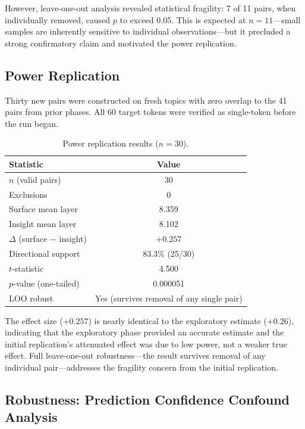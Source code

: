 \documentclass[10pt]{article}
\begin{document}
However, leave-one-out analysis revealed statistical fragility: 7 of 11 pairs, when individually removed, caused $p$ to exceed 0.05. This is expected at $n{=}11$---small samples are inherently sensitive to individual observations---but it precluded a strong confirmatory claim and motivated the power replication.

\subsection{Power Replication}
\label{sec:power_rep}

Thirty new pairs were constructed on fresh topics with zero overlap to the 41 pairs from prior phases. All 60 target tokens were verified as single-token before the run began.

\begin{table}[h]
\centering
\caption{Power replication results ($n{=}30$).}
\label{tab:power_rep}
\begin{tabular}{lc}
\toprule
\textbf{Statistic} & \textbf{Value} \\
\midrule
$n$ (valid pairs) & 30 \\
Exclusions & 0 \\
Surface mean layer & 8.359 \\
Insight mean layer & 8.102 \\
$\Delta$ (surface $-$ insight) & $+0.257$ \\
Directional support & 83.3\% (25/30) \\
$t$-statistic & 4.500 \\
$p$-value (one-tailed) & 0.000051 \\
LOO robust & Yes (survives removal of any single pair) \\
\bottomrule
\end{tabular}
\end{table}

The effect size ($+0.257$) is nearly identical to the exploratory estimate ($+0.26$), indicating that the exploratory phase provided an accurate estimate and the initial replication's attenuated effect was due to low power, not a weaker true effect. Full leave-one-out robustness---the result survives removal of any individual pair---addresses the fragility concern from the initial replication.

\subsection{Robustness: Prediction Confidence Confound Analysis}
\label{sec:confound}
\end{document}
